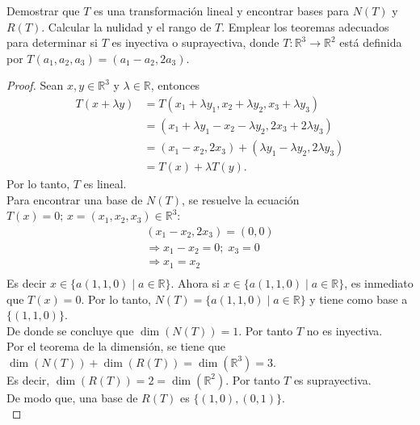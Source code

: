 \documentclass[11pt]{article}
\numberwithin{equation}{section}
\newcommand{\R}{\mathbb{R}}
\begin{document}
\begin{Problema}{} Demostrar que $T$ es una transformación lineal y encontrar bases para $N(T)$ y $R(T)$. 
    Calcular la nulidad y el rango de $T$. Emplear los teoremas adecuados para determinar si $T$ es inyectiva o 
    suprayectiva, donde $T: \R^3 \to \R^2$ está definida por $T(a_1, a_2, a_3) = (a_1 - a_2, 2a_3)$.
\end{Problema}
\begin{proof}
    Sean $x,y \in \R^3$ y $\lambda \in \R$, entonces
    \begin{align*}
        T(x+\lambda y) &=T(x_1+\lambda y_1,x_2 +\lambda y_2, x_3 + \lambda y_3) \\
        &= (x_1 + \lambda y_1 - x_2-\lambda y_2, 2x_3+ 2\lambda y_3)\\
        &= (x_1 -x_2, 2x_3)+(\lambda y_1- \lambda y_2, 2\lambda y_3) \\
        &= T(x) + \lambda T(y).
    \end{align*}
    Por lo tanto, $T$ es lineal.\\
    Para encontrar una base de $N(T)$, se resuelve la ecuación $T(x) = 0;\, x=(x_1,x_2,x_3) \in \R^3$:
    \begin{align*}
        (x_1 - x_2, 2x_3) = (0,0) \\
        \Rightarrow x_1 - x_2 = 0;\;x_3=0 \\
        \Rightarrow x_1 = x_2 \\
    \end{align*}
    Es decir $x\in \{a(1,1,0)\mid a\in \R \}$. Ahora si $x\in \{a(1,1,0)\mid a\in \R \}$, es inmediato que 
    $T(x)=0$. Por lo tanto, $N(T)=\{a(1,1,0)\mid a\in \R \}$ y tiene como base a $\{(1,1,0)\}$.\\
    De donde se concluye que $\dim(N(T))=1$. Por tanto $T$ no es inyectiva.\\
    Por el teorema de la dimensión, se tiene que $\dim(N(T))+\dim(R(T))=\dim(\R^3)=3$. \\ 
    Es decir, $\dim(R(T))=2=\dim(\R^2)$. Por tanto $T$ es suprayectiva.\\
    De modo que, una base de $R(T)$ es $\{(1,0),(0,1)\}$.\\
\end{proof}
\end{document}

